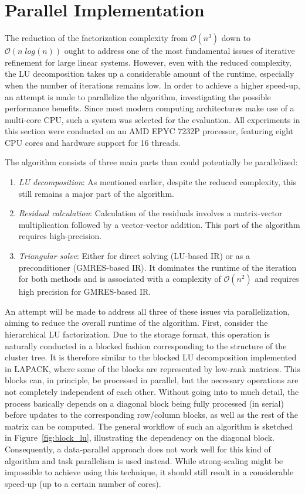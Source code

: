 \section{Parallel Implementation}
\label{sec:parallel_implementation}

The reduction of the factorization complexity from $\mathcal{O}(n^3)$ down to $\mathcal{O}(n\;log(n))$ ought to address one of the most fundamental issues of iterative refinement for large linear systems. However, even with the reduced complexity, the LU decomposition takes up a considerable amount of the runtime, especially when the number of iterations remains low. In order to achieve a higher speed-up, an attempt is made to parallelize the algorithm, investigating the possible performance benefits. Since most modern computing architectures make use of a multi-core CPU, such a system was selected for the evaluation. All experiments in this section were conducted on an AMD EPYC 7232P processor, featuring eight CPU cores and hardware support for 16 threads. 

The algorithm consists of three main parts than could potentially be parallelized:
\begin{enumerate}
    \item \textit{LU decomposition}: As mentioned earlier, despite the reduced complexity, this still remains a major part of the algorithm.
    \item \textit{Residual calculation}: Calculation of the residuals involves a matrix-vector multiplication followed by a vector-vector addition. This part of the algorithm requires high-precision.
    \item \textit{Triangular solve}: Either for direct solving (LU-based IR) or as a preconditioner (GMRES-based IR). It dominates the runtime of the iteration for both methods and is associated with a complexity of $\mathcal{O}(n^2)$ and requires high precision for GMRES-based IR.
\end{enumerate}

\noindent An attempt will be made to address all three of these issues via parallelization, aiming to reduce the overall runtime of the algorithm. First, consider the hierarchical LU factorization. Due to the storage format, this operation is naturally conducted in a blocked fashion corresponding to the structure of the cluster tree. It is therefore similar to the blocked LU decomposition implemented in LAPACK, where some of the blocks are represented by low-rank matrices. This blocks can, in principle, be processed in parallel, but the necessary operations are not completely independent of each other. Without going into to much detail, the process basically depends on a diagonal block being fully processed (in serial) before updates to the corresponding row/column blocks, as well as the rest of the matrix can be computed. The general workflow of such an algorithm is sketched in Figure~\hyperref[fig:block_lu]{\ref{fig:block_lu}}, illustrating the dependency on the diagonal block. Consequently, a data-parallel approach does not work well for this kind of algorithm and task parallelism is used instead. While strong-scaling might be impossible to achieve using this technique, it should still result in a considerable speed-up (up to a certain number of cores).

